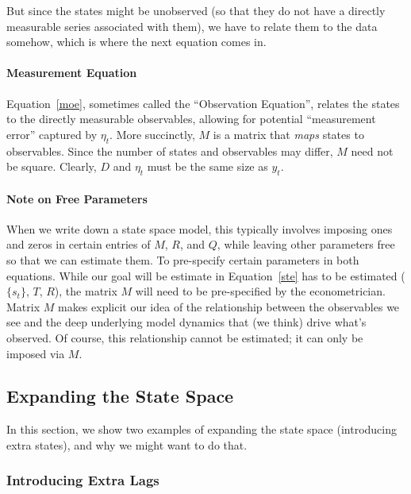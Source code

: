 \documentclass[a4paper,12pt]{article}
\begin{document}
But since the states might be unobserved (so that they do not have a
directly measurable series associated with them), we have to relate them
to the data somehow, which is where the next equation comes in.

\paragraph{Measurement Equation} Equation~\ref{moe}, sometimes called
the ``Observation Equation'', relates the states to the directly
measurable observables, allowing for potential ``measurement error''
captured by $\eta_t$. More succinctly, $M$ is a matrix that \emph{maps}
states to observables. Since the number of states and observables may
differ, $M$ need not be square. Clearly, $D$ and $\eta_t$ must be the
same size as $y_t$.

\paragraph{Note on Free Parameters} 
When we write down a state space model, this typically involves imposing
ones and zeros in certain entries of $M$, $R$, and $Q$, while leaving
other parameters free so that we can estimate them.  To pre-specify
certain parameters in both equations.  While our goal will be estimate
in Equation~\ref{ste} has to be estimated ($\{s_t\}$, $T$, $R$), the
matrix $M$ will need to be pre-specified by the econometrician. Matrix
$M$ makes explicit our idea of the relationship between the observables
we see and the deep underlying model dynamics that (we think) drive
what's observed. Of course, this relationship cannot be estimated; it
can only be imposed via $M$.

\newpage
\subsection{Expanding the State Space}

In this section, we show two examples of expanding the state space (introducing extra states), and why we might want to do that. 

\subsubsection{Introducing Extra Lags}
\end{document}
